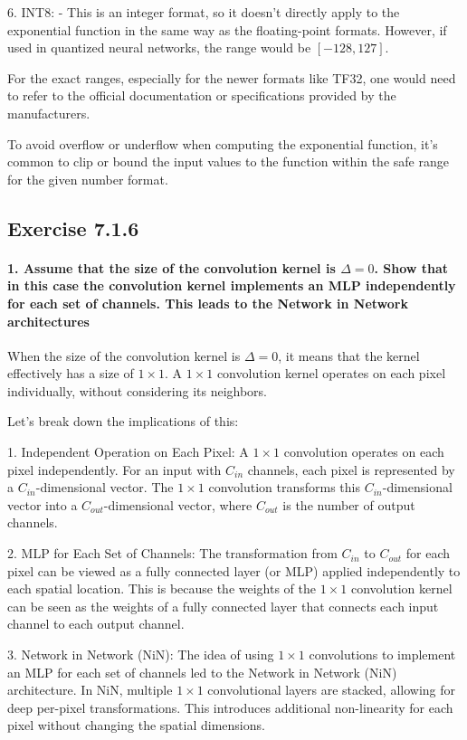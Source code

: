 6. INT8:
- This is an integer format, so it doesn't directly apply to the exponential function in the same way as the floating-point formats. However, if used in quantized neural networks, the range would be \([-128, 127]\).

For the exact ranges, especially for the newer formats like TF32, one would need to refer to the official documentation or specifications provided by the manufacturers.

To avoid overflow or underflow when computing the exponential function, it's common to clip or bound the input values to the function within the safe range for the given number format.

\subsection{Exercise 7.1.6}

\paragraph{1. Assume that the size of the convolution kernel is \(\Delta = 0 \). Show that in this case the convolution kernel implements an MLP independently for each set of channels. This leads to the Network in Network architectures}

When the size of the convolution kernel is \( \Delta = 0 \), it means that the kernel effectively has a size of \( 1 \times 1 \).
A \( 1 \times 1 \) convolution kernel operates on each pixel individually, without considering its neighbors.

Let's break down the implications of this:

1. Independent Operation on Each Pixel: A \( 1 \times 1 \) convolution operates on each pixel independently.
For an input with \( C_{in} \) channels, each pixel is represented by a \( C_{in} \)-dimensional vector.
The \( 1 \times 1 \) convolution transforms this \( C_{in} \)-dimensional vector into a \( C_{out} \)-dimensional vector, where \( C_{out} \) is the number of output channels.

2. MLP for Each Set of Channels: The transformation from \( C_{in} \) to \( C_{out} \) for each pixel can be viewed as a fully connected layer (or MLP) applied independently to each spatial location.
This is because the weights of the \( 1 \times 1 \) convolution kernel can be seen as the weights of a fully connected layer that connects each input channel to each output channel.

3. Network in Network (NiN): The idea of using \( 1 \times 1 \) convolutions to implement an MLP for each set of channels led to the Network in Network (NiN) architecture.
In NiN, multiple \( 1 \times 1 \) convolutional layers are stacked, allowing for deep per-pixel transformations. This introduces additional non-linearity for each pixel without changing the spatial dimensions.

